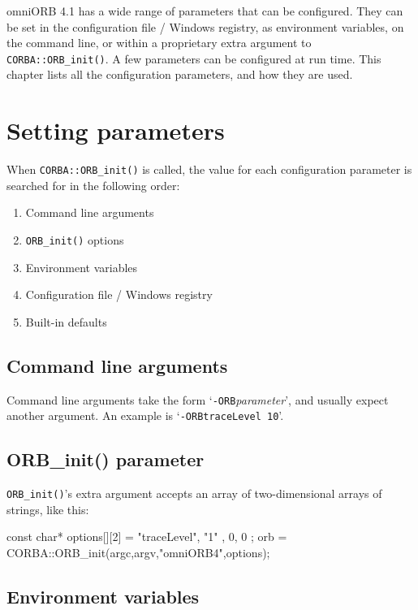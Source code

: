 \documentclass[11pt,twoside,a4paper]{book}
\newcommand{\op}[1]{\texttt{#1()}}
\newcommand{\cmdline}[1]{\texttt{#1}}
\begin{document}
omniORB 4.1 has a wide range of parameters that can be
configured. They can be set in the configuration file / Windows
registry, as environment variables, on the command line, or within a
proprietary extra argument to \op{CORBA::ORB\_init}. A few parameters
can be configured at run time. This chapter lists all the
configuration parameters, and how they are used.

\section{Setting parameters}

When \op{CORBA::ORB\_init} is called, the value for each configuration
parameter is searched for in the following order:

\begin{enumerate}

\item Command line arguments
\item \op{ORB\_init} options
\item Environment variables
\item Configuration file / Windows registry
\item Built-in defaults

\end{enumerate}

\subsection{Command line arguments}

Command line arguments take the form
`\cmdline{-ORB}\textit{parameter}', and usually expect another
argument. An example is `\cmdline{-ORBtraceLevel 10}'.


\subsection{ORB\_init() parameter}

\op{ORB\_init}'s extra argument accepts an array of two-dimensional
arrays of strings, like this:

\begin{cxxlisting}
const char* options[][2] = { { "traceLevel", "1" }, { 0, 0 } }; 
orb = CORBA::ORB_init(argc,argv,"omniORB4",options); 
\end{cxxlisting}


\subsection{Environment variables}
\end{document}
